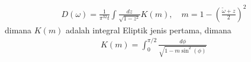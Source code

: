 \begin{align}
D(\omega) = \frac{1}{\pi^32t}\int \frac{dz}{\sqrt{1-z^2}} K(m), \quad m = 1 - \left( \frac{\tilde{\omega} + z}{2} \right)^2
\end{align}
dimana $K(m)$ adalah integral Eliptik jenis pertama, dimana
\begin{align}
K(m) = \int_0^{\pi/2} \frac{d\phi}{\sqrt{1 - m\sin^2(\phi)}}
\end{align}


